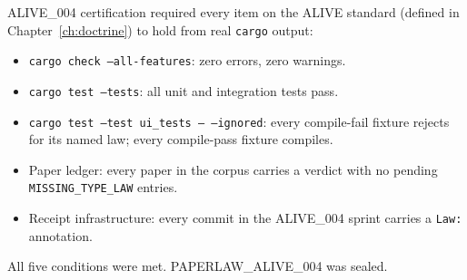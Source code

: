 ALIVE\_004 certification required every item on the ALIVE standard (defined in
Chapter~\ref{ch:doctrine}) to hold from real \texttt{cargo} output:

\begin{itemize}
  \item \texttt{cargo check --all-features}: zero errors, zero warnings.
  \item \texttt{cargo test --tests}: all unit and integration tests pass.
  \item \texttt{cargo test --test ui\_tests -- --ignored}: every compile-fail
    fixture rejects for its named law; every compile-pass fixture compiles.
  \item Paper ledger: every paper in the corpus carries a verdict with no
    pending \texttt{MISSING\_TYPE\_LAW} entries.
  \item Receipt infrastructure: every commit in the ALIVE\_004 sprint carries
    a \texttt{Law:} annotation.
\end{itemize}

All five conditions were met. PAPERLAW\_ALIVE\_004 was sealed.
